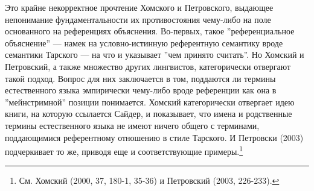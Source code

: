 \documentclass[11pt]{book}
\begin{document}
Это крайне некорректное прочтение Хомского и Петровского, выдающее непонимание фундаментальности их противостояния чему-либо на поле основанного на референциях объяснения. Во-первых, такое ''референциальное объяснение'' --- намек на условно-истинную референтную семантику вроде семантики Тарского --- на что и указывает ''чем принято считать''. Но Хомский и Петровский, а также множество других лингвистов, категорически отвергают такой подход. Вопрос для них заключается в том, поддаются ли термины естественного языка эмпирически чему-либо вроде референции как она в ''мейнстримной'' позиции понимается. Хомский категорически отвергает идею книги, на которую ссылается Сайдер, и показывает, что имена и родственные термины естественного языка не имеют ничего общего с терминами, поддающимися референтному отношению в стиле Тарского. И Петровски (2003) подчеркивает то же, приводя еще и соответствующие примеры.\footnote{См. Хомский (2000, 37, 180-1, 35-36) и Петровский (2003, 226-233).}
\end{document}

